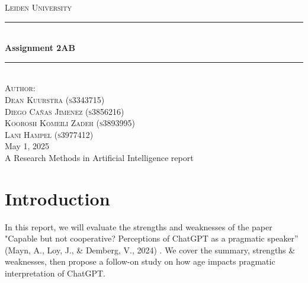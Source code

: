 \documentclass[12pt]{article}
\begin{document}

\begin{titlepage}

\newcommand{\HRule}{\rule{\linewidth}{0.5mm}}

\center
\begin{figure}[H]  \end{figure}
\textsc{\LARGE Leiden University}\\[1.5cm]


\HRule \\[0.9cm]
{ \huge \bfseries Assignment 2AB}\\[0.1cm] %
\HRule \\[1.5cm]

\textsc{Author:}\\[0.3cm]
\textsc{\Large Dean Kuurstra (s3343715)}\\[0.5cm]
\textsc{\Large Diego Cañas Jimenez (s3856216)}\\[0.5cm]
\textsc{\Large Koorosh Komeili Zadeh (s3893995)}\\[0.5cm]
\textsc{\Large Lani Hampel (s3977412)}\\[0.5cm]

\large May 1, 2025\\
A Research Methods in Artificial Intelligence report\\

\vfill %

\end{titlepage}

\newpage
\section{Introduction}

In this report, we will evaluate the strengths and weaknesses of the paper "Capable but not cooperative? Perceptions of ChatGPT as a pragmatic speaker” (Mayn, A., Loy, J., \& Demberg, V., 2024) \cite{pragmatic_gpt}. We cover the summary, strengths & weaknesses, then propose a follow-on study on how age impacts pragmatic interpretation of ChatGPT.
\end{document}
